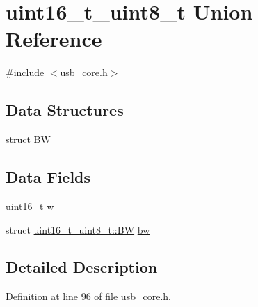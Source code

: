 \hypertarget{unionuint16__t__uint8__t}{\section{uint16\-\_\-t\-\_\-uint8\-\_\-t Union Reference}
\label{unionuint16__t__uint8__t}
}


{\ttfamily \#include $<$usb\-\_\-core.\-h$>$}

\subsection*{Data Structures}
\begin{DoxyCompactItemize}
\item 
struct \hyperlink{structuint16__t__uint8__t_1_1_b_w}{B\-W}
\end{DoxyCompactItemize}
\subsection*{Data Fields}
\begin{DoxyCompactItemize}
\item 
\hyperlink{stdint_8h_a273cf69d639a59973b6019625df33e30}{uint16\-\_\-t} \hyperlink{unionuint16__t__uint8__t_af420fddc8a5c2a365a3602226f4deafa}{w}
\item 
struct \hyperlink{structuint16__t__uint8__t_1_1_b_w}{uint16\-\_\-t\-\_\-uint8\-\_\-t\-::\-B\-W} \hyperlink{unionuint16__t__uint8__t_a9bd9304e89c72f660cd8407fffe9f2b2}{bw}
\end{DoxyCompactItemize}


\subsection{Detailed Description}


Definition at line 96 of file usb\-\_\-core.\-h.



